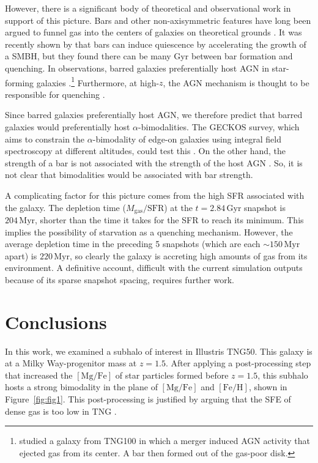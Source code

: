 \documentclass[twocolumn]{aastex631}
\newcommand{\Gyr}{\ensuremath{\textrm{Gyr}}}
\newcommand{\Myr}{\ensuremath{\textrm{Myr}}}
\newcommand{\FeH}{\ensuremath{[\textrm{Fe}/\textrm{H}]}}
\newcommand{\MgFe}{\ensuremath{[\textrm{Mg}/\textrm{Fe}]}}
\begin{document}
However, there is a significant body of theoretical and observational work in support of this picture. Bars and other non-axisymmetric features have long been argued to funnel gas into the centers of galaxies on theoretical grounds \citep{1989Natur.338...45S,2010MNRAS.407.1529H}. It was recently shown by \citet{2024arXiv240906783F} that bars can induce quiescence by accelerating the growth of a SMBH, but they found there can be many Gyr between bar formation and quenching. In observations, barred galaxies preferentially host AGN in star-forming galaxies \citep{2012ApJS..198....4O,2022A&A...661A.105S}.\footnote{\citet{2022A&A...668L...3L} studied a galaxy from TNG100 in which a merger induced AGN activity that ejected gas from its center. A bar then formed out of the gas-poor disk.} Furthermore, at high-$z$, the AGN mechanism is thought to be responsible for quenching \citep[e.g.][and references therein]{2023arXiv230806317D,2024arXiv240417945P,2024arXiv240518685M,2024Natur.630...54B}.

Since barred galaxies preferentially host AGN, we therefore predict that barred galaxies would preferentially host $\alpha$-bimodalities. The GECKOS survey, which aims to constrain the $\alpha$-bimodality of edge-on galaxies using integral field spectroscopy at different altitudes, could test this \citep{2024IAUS..377...27V}. On the other hand, the strength of a bar is not associated with the strength of the host AGN \citep[e.g.]{2022A&A...661A.105S}. So, it is not clear that bimodalities would be associated with bar strength.

A complicating factor for this picture comes from the high SFR associated with the galaxy. The depletion time ($M_{\textrm{gas}}/\textrm{SFR}$) at the $t=2.84\,\Gyr$ snapshot is $204\,\Myr$, shorter than the time it takes for the SFR to reach its minimum. This implies the possibility of starvation as a quenching mechanism. However, the average depletion time in the preceding 5 snapshots (which are each $\sim150\,\Myr$ apart) is $220\,\Myr$, so clearly the galaxy is accreting high amounts of gas from its environment. A definitive account, difficult with the current simulation outputs because of its sparse snapshot spacing, requires further work.

\section{Conclusions}\label{sec:conc}
In this work, we examined a subhalo of interest in Illustris TNG50. This galaxy is at a Milky Way-progenitor mass at $z=1.5$. After applying a post-processing step that increased the \MgFe{} of star particles formed before $z=1.5$, this subhalo hosts a strong bimodality in the plane of \MgFe{} and \FeH{}, shown in Figure~\ref{fig:fig1}. This post-processing is justified by arguing that the SFE of dense gas is too low in TNG \citep[][see discussion in our Section~\ref{ssec:sfe}]{2024arXiv240909121H}.
\end{document}
